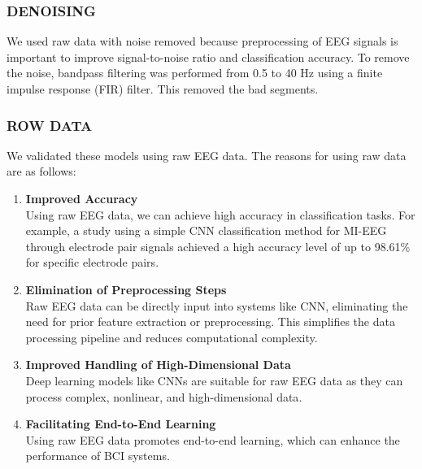 \subsubsection{DENOISING}
We used raw data with noise removed because preprocessing of EEG signals is important to improve signal-to-noise ratio and classification accuracy. To remove the noise, bandpass filtering was performed from 0.5 to 40 Hz using a finite impulse response (FIR) filter. This removed the bad segments\cite{ma2022large}.

\subsubsection{ROW DATA}
We validated these models using raw EEG data. The reasons for using raw data are as follows:

\begin{enumerate}
  \item \textbf{Improved Accuracy} \\
    Using raw EEG data, we can achieve high accuracy in classification tasks. For example, a study using a simple CNN classification method for MI-EEG through electrode pair signals achieved a high accuracy level of up to 98.61\% for specific electrode pairs\cite{lun2020simplified}.\\
  
  \item \textbf{Elimination of Preprocessing Steps} \\
    Raw EEG data can be directly input into systems like CNN, eliminating the need for prior feature extraction or preprocessing. This simplifies the data processing pipeline and reduces computational complexity\cite{tibrewal2022classification}.\\
  
  \item \textbf{Improved Handling of High-Dimensional Data} \\
    Deep learning models like CNNs are suitable for raw EEG data as they can process complex, nonlinear, and high-dimensional data\cite{tibrewal2022classification}.\\
  
  \item \textbf{Facilitating End-to-End Learning} \\
    Using raw EEG data promotes end-to-end learning, which can enhance the performance of BCI systems\cite{tibrewal2022classification}.\\
  

\end{enumerate}
